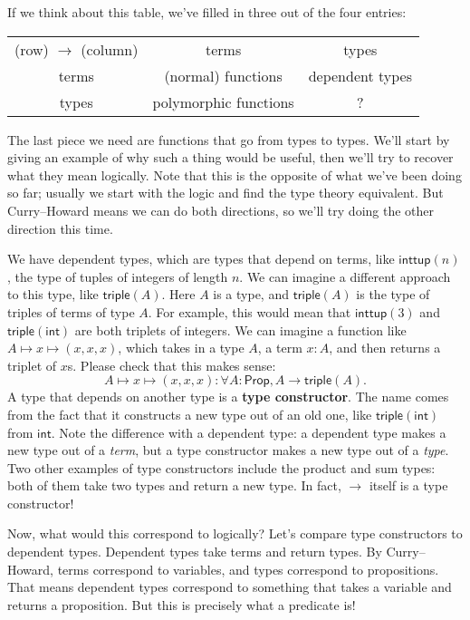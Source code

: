 \documentclass[11pt,paper=letter]{scrartcl}
\renewcommand{\sf}{\mathsf}
\newcommand{\prop}{\mathsf{Prop}}
\begin{document}
If we think about this table, we've filled in three out of the four entries:

\begin{center}
\begin{tabular}{ccc}
(row) $\to$ (column) & terms & types \\
terms & (normal) functions & dependent types \\
types & polymorphic functions & ?
\end{tabular}
\end{center}

The last piece we need are functions that go from types to types. We'll start by giving an example of why such a thing would be useful, then we'll try to recover what they mean logically. Note that this is the opposite of what we've been doing so far; usually we start with the logic and find the type theory equivalent. But Curry--Howard means we can do both directions, so we'll try doing the other direction this time.

We have dependent types, which are types that depend on terms, like $\sf{inttup}(n)$, the type of tuples of integers of length $n$. We can imagine a different approach to this type, like $\sf{triple}(A)$. Here $A$ is a type, and $\sf{triple}(A)$ is the type of triples of terms of type $A$. For example, this would mean that $\sf{inttup}(3)$ and $\sf{triple}(\sf{int})$ are both triplets of integers. We can imagine a function like $A \mapsto x \mapsto (x, x, x)$, which takes in a type $A$, a term $x: A$, and then returns a triplet of $x$s. Please check that this makes sense: \[
  A \mapsto x \mapsto (x, x, x): \forall A: \prop, A \to \sf{triple}(A).
\]
A type that depends on another type is a \textbf{type constructor}. The name comes from the fact that it constructs a new type out of an old one, like $\sf{triple}(\sf{int})$ from $\sf{int}$. Note the difference with a dependent type: a dependent type makes a new type out of a \emph{term}, but a type constructor makes a new type out of a \emph{type}. Two other examples of type constructors include the product and sum types: both of them take two types and return a new type. In fact, $\to$ itself is a type constructor!

Now, what would this correspond to logically? Let's compare type constructors to dependent types. Dependent types take terms and return types. By Curry--Howard, terms correspond to variables, and types correspond to propositions. That means dependent types correspond to something that takes a variable and returns a proposition. But this is precisely what a predicate is!
\end{document}

